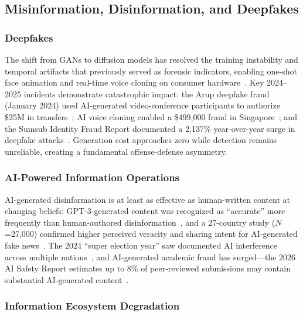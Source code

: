 \subsection{Misinformation, Disinformation, and Deepfakes}
\label{sec:threat-misinfo}

\subsubsection{Deepfakes}
\label{sec:threat-deepfake}

The shift from GANs to diffusion models has resolved the training instability and temporal artifacts that previously served as forensic indicators, enabling one-shot face animation and real-time voice cloning on consumer hardware~\cite{pei2024deepfakesurvey}. Key 2024--2025 incidents demonstrate catastrophic impact: the Arup deepfake fraud (January 2024) used AI-generated video-conference participants to authorize \$25M in transfers~\cite{wef2025arup}; AI voice cloning enabled a \$499,000 fraud in Singapore~\cite{brightside2025phishing}; and the Sumsub Identity Fraud Report documented a 2,137\% year-over-year surge in deepfake attacks~\cite{sumsub2024}. Generation cost approaches zero while detection remains unreliable, creating a fundamental offense-defense asymmetry.


\subsubsection{AI-Powered Information Operations}
\label{sec:threat-infoop}

AI-generated disinformation is at least as effective as human-written content at changing beliefs: GPT-3-generated content was recognized as ``accurate'' more frequently than human-authored disinformation~\cite{spitale2023gpt3}, and a 27-country study ($N$=27,000) confirmed higher perceived veracity and sharing intent for AI-generated fake news~\cite{stefkovics2026fakenews}. The 2024 ``super election year'' saw documented AI interference across multiple nations~\cite{restofworld2024tracker}, and AI-generated academic fraud has surged---the 2026 AI Safety Report estimates up to 8\% of peer-reviewed submissions may contain substantial AI-generated content~\cite{aisafetyreport2026}.


\subsubsection{Information Ecosystem Degradation}
\label{sec:threat-ecosystem}

